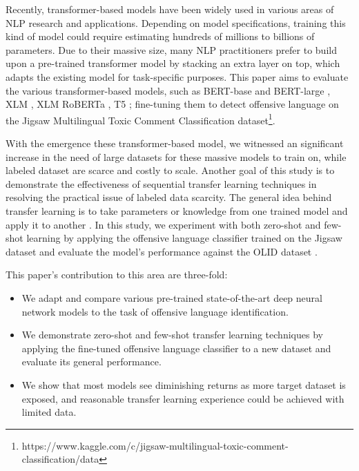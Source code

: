 \documentclass[11pt,a4paper]{article}
\begin{document}
Recently, transformer-based models \citep{DBLP:journals/corr/VaswaniSPUJGKP17} have been widely used in various areas of NLP research and applications. Depending on model specifications, training this kind of model could require estimating hundreds of millions to billions of parameters. Due to their massive size, many NLP practitioners prefer to build upon a pre-trained transformer model by stacking an extra layer on top, which adapts the existing model for task-specific purposes. This paper aims to evaluate the various transformer-based models, such as BERT-base and BERT-large \citep{DBLP:journals/corr/abs-1810-04805}, XLM \citep{DBLP:journals/corr/abs-1901-07291}, XLM RoBERTa \citep{conneau2019unsupervised}, T5 \citep{raffel2019exploring}; fine-tuning them to detect offensive language on the Jigsaw Multilingual Toxic Comment Classification dataset\footnote{https://www.kaggle.com/c/jigsaw-multilingual-toxic-comment-classification/data}.

With the emergence these transformer-based model, we witnessed an significant increase in the need of large datasets for these massive models to train on, while labeled dataset are scarce and costly to scale. Another goal of this study is to demonstrate the effectiveness of sequential transfer learning techniques in resolving the practical issue of labeled data scarcity. The general idea behind transfer learning is to take parameters or knowledge from one trained model and apply it to another \citep{ruder-etal-2019-transfer}. In this study, we experiment with both zero-shot and few-shot learning by applying the offensive language classifier trained on the Jigsaw dataset and evaluate the model's performance against the OLID dataset \citep{zampieri-etal-2019-predicting}. 

This paper’s contribution to this area are three-fold: 

\begin{itemize}
  \item We adapt and compare various pre-trained state-of-the-art deep neural network models to the task of offensive language identification.
  \item We demonstrate zero-shot and few-shot transfer learning techniques by applying the fine-tuned offensive language classifier to a new dataset and evaluate its general performance. 
  \item We show that most models see diminishing returns as more target dataset is exposed, and reasonable transfer learning experience could be achieved with limited data. 
\end{itemize}
\end{document}
